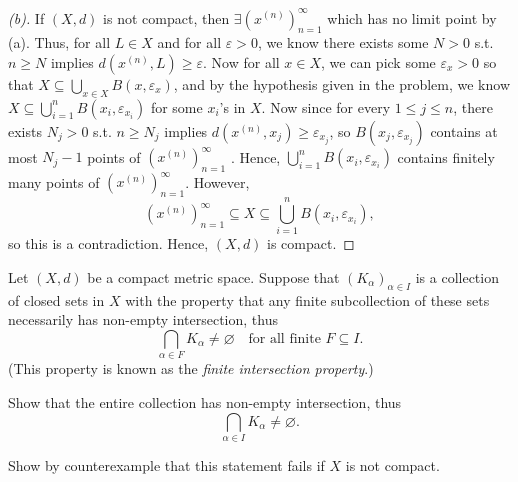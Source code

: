 \begin{proof}[(b)]
  If \((X, d)\) is not compact, then \(\exists \left( x^{(n)} \right)_{n=1}^{\infty}  \) which has no limit point by (a). Thus, for all \(L \in X\) and for all \(\varepsilon > 0\), we know there exists some \(N > 0\) s.t. \(n \ge N\) implies \(d \left( x^{(n)}, L \right) \ge \varepsilon  \). Now for all \(x \in X\), we can pick some \(\varepsilon_x > 0\) so that \(X \subseteq \bigcup_{x \in X} B(x, \varepsilon_x) \), and by the hypothesis given in the problem, we know \(X \subseteq \bigcup_{i=1}^{n} B(x_i, \varepsilon _{x_i})\) for some \(x_i\)'s in \(X\). Now since for every \(1 \le j \le n\), there exists \(N_j > 0\) s.t. \(n \ge N_j\) implies \(d \left( x^{(n)}, x_j \right) \ge \varepsilon_{x_j} \), so \(B(x_j, \varepsilon _{x_j})\) contains at most \(N_j - 1\) points of \(\left( x^{(n)} \right)_{n=1}^{\infty}  \) . Hence, \(\bigcup_{i=1}^{n} B(x_i, \varepsilon _{x_{i} }) \) contains finitely many points of \(\left( x^{(n)} \right)_{n=1}^{\infty}  \). However,
  \[
    \left( x^{(n)} \right)_{n=1}^{\infty} \subseteq X \subseteq \bigcup_{i=1}^{n} B(x_i, \varepsilon _{x_i}),  
  \] so this is a contradiction. Hence, \((X, d)\) is compact.                      
\end{proof}

\begin{problem}[10pts]
  Let $(X,d)$ be a compact metric space. Suppose that $(K_\alpha)_{\alpha \in I}$ is a collection of closed sets in $X$ with the property that any finite subcollection of these sets necessarily has non-empty intersection, thus
\[
\bigcap_{\alpha \in F} K_\alpha \neq \varnothing \quad \text{for all finite } F \subseteq I.
\]
(This property is known as the \emph{finite intersection property}.)  

Show that the entire collection has non-empty intersection, thus
\[
\bigcap_{\alpha \in I} K_\alpha \neq \varnothing.
\]

Show by counterexample that this statement fails if $X$ is not compact.
 
\end{problem}

